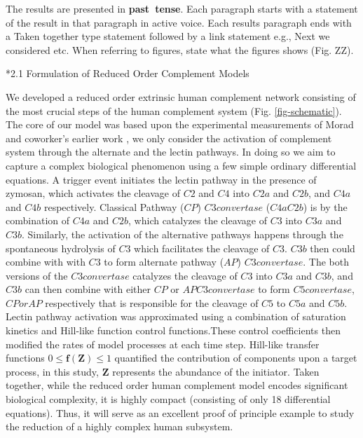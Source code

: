 \documentclass[12pt]{article}
\makeatletter
\renewcommand\subsection{\@startsection
	{subsection}{2}{0mm}
	{-0.05in}
	{-0.5\baselineskip}
	{\normalfont\normalsize\bfseries}}
\makeatother
\begin{document}
The results are presented in \textbf{past~tense}. Each paragraph starts with a statement of the result in that paragraph in active voice.
Each results paragraph ends with a Taken together type statement followed by a link statement e.g., Next we considered etc. When referring to figures, state what the figures shows (Fig. ZZ).

\subsection*{2.1 Formulation of Reduced Order Complement Models} 

We developed a reduced order extrinsic human complement network consisting of the most crucial steps of the human complement system (Fig. \ref{fig-schematic}). The core of our model was based upon the experimental measurements of Morad and coworker's earlier work \cite{morad2015time}, we only consider the activation of complement system through the alternate and the lectin pathways. In doing so we aim to capture a complex biological phenomenon using a few simple ordinary differential equations.  A trigger event initiates the lectin pathway in the presence of zymosan, which activates the cleavage of $C2$ and $C4$ into $C2a$ and $C2b$, and $C4a$ and $C4b$ respectively. Classical Pathway ($CP$) $C3 convertase$ ($C4aC2b$) is by the combination of $C4a$ and $C2b$, which catalyzes the cleavage of $C3$ into $C3a$ and $C3b$. Similarly, the activation of the alternative pathways happens through the spontaneous hydrolysis of $C3$ which facilitates the cleavage of $C3$. $C3b$ then could combine with with $C3$ to form alternate pathway ($AP$) $C3 convertase$. The both  versions of the $C3 convertase$ catalyzes the cleavage of $C3$ into $C3a$ and $C3b$, and $C3b$ can then combine with either $CP$ or $AP C3 convertase$ to form $C5 convertase$, $CP or AP$ respectively that is responsible for the cleavage of $C5$ to $C5a$ and $C5b$. Lectin pathway activation was approximated using a combination of saturation kinetics and Hill-like function control functions.These control coefficients then modified the rates of model processes at each time step. Hill-like transfer functions $0 \le \mathbf{f (Z)}  \le 1$ quantified the contribution of components upon a target process, in this study, $\mathbf{Z}$ represents the abundance of the initiator. Taken together, while the reduced order human complement model encodes significant biological complexity, it is highly compact (consisting of only 18 differential equations). Thus, it will serve as an excellent proof
of principle example to study the reduction of a highly complex human subsystem.
\end{document}
